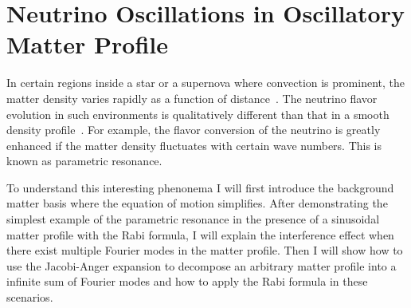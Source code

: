
\chapter{\label{chap:matter}Neutrino Oscillations in Oscillatory Matter Profile}

In certain regions inside a star or a supernova where convection is prominent, the matter density varies rapidly as a function of distance~\cite{Muller2015, Couch2015}. The neutrino flavor evolution in such environments is qualitatively different than that in a smooth density profile~\cite{Krastev1989, Loreti1994,Akhmedov2000, Friedland2006,Kneller2010,Kneller2013,Patton2014}. For example, the flavor conversion of the neutrino is greatly enhanced if the matter density fluctuates with certain wave numbers. This is known as parametric resonance.

To understand this interesting phenonema I will first introduce the background matter basis where the equation of motion simplifies. After demonstrating the simplest example of the parametric resonance in the presence of a sinusoidal matter profile with the Rabi formula, I will explain the interference effect when there exist multiple Fourier modes in the matter profile. Then I will show how to use the Jacobi-Anger expansion to decompose an arbitrary matter profile into a infinite sum of Fourier modes and how to apply the Rabi formula in these scenarios.






